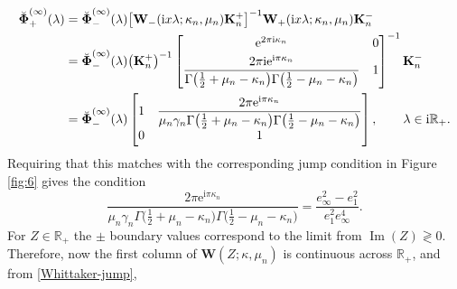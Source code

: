 \documentclass[11pt]{article}
\numberwithin{equation}{section}
\numberwithin{equation}{section}
\newcommand{\ee}{\mathrm{e}}
\newcommand{\ii}{\mathrm{i}}
\newcommand{\para}[1]{\breve{#1}}
\newcommand{\R}{{\mathbb{R}}}
\newcommand{\im}{\operatorname{Im}}
\begin{document}
\begin{align*}
 \para{\boldsymbol{\Phi}}_+^{(\infty)}(\lambda)&=\para{\boldsymbol{\Phi}}_-^{(\infty)}(\lambda)\big[\mathbf{W}_-(\ii x\lambda;\kappa_n,\mu_n)\mathbf{K}_n^{+}\big]^{-1}\mathbf{W}_+(\ii x\lambda;\kappa_n,\mu_n)\mathbf{K}_n^-\\
 &=\para{\boldsymbol{\Phi}}_-^{(\infty)}(\lambda)
 \big(\mathbf{K}^+_n\big)^{-1}
 \begin{bmatrix}
 \ee^{2\pi \ii\kappa_n} & 0\vspace{1mm}\\
 \displaystyle \frac{2\pi \ii\ee^{\ii\pi\kappa_n}}{\Gamma\big(\frac{1}{2}+\mu_n-\kappa_n\big)\Gamma\big(\frac{1}{2}-\mu_n-\kappa_n\big)} & 1
 \end{bmatrix}^{-1}
 \mathbf{K}^-_n\\
 &=\para{\boldsymbol{\Phi}}_-^{(\infty)}(\lambda)\begin{bmatrix}
 1 & \displaystyle\frac{2\pi \ee^{\ii\pi\kappa_n}}{\mu_n\gamma_n\Gamma\big(\frac{1}{2}+\mu_n-\kappa_n\big)\Gamma\big(\frac{1}{2}-\mu_n-\kappa_n\big)}\\
 0 & 1
 \end{bmatrix},\qquad \lambda\in \ii\mathbb{R}_+.
\end{align*}
Requiring that this matches with the corresponding jump condition in Figure \ref{fig:6} gives the condition
\begin{equation*}%
 \frac{2\pi \ee^{\ii\pi\kappa_n}}{\mu_n\gamma_n\Gamma\big(\frac{1}{2}+\mu_n-\kappa_n\big)\Gamma\big(\frac{1}{2}-\mu_n-\kappa_n\big)} = \frac{e_\infty^2-e_1^2}{e_1^2e_\infty^4}.
\end{equation*}
For $Z\in\R_+$ the $\pm$ boundary values correspond to the limit from $\im(Z)\gtrless 0$. Therefore, now the first column of $\mathbf{W}(Z;\kappa,\mu_n)$ is continuous across $\mathbb{R}_+$, and from \eqref{Whittaker-jump},
\end{document}
